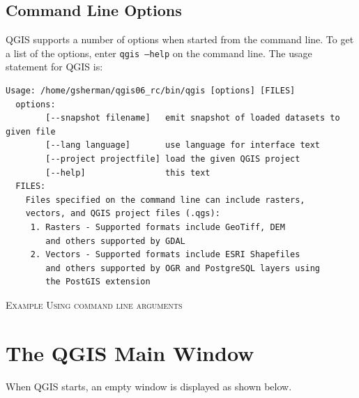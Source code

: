 \subsection{Command Line Options}
QGIS supports a number of options when started from the command line. To get a
list of the options, enter \texttt{qgis ---help} on the command line. The usage
statement for QGIS is:
\small
\begin{verbatim}
Usage: /home/gsherman/qgis06_rc/bin/qgis [options] [FILES]
  options:
        [--snapshot filename]   emit snapshot of loaded datasets to given file
        [--lang language]       use language for interface text
        [--project projectfile] load the given QGIS project
        [--help]                this text
  FILES:
    Files specified on the command line can include rasters,
    vectors, and QGIS project files (.qgs):
     1. Rasters - Supported formats include GeoTiff, DEM
        and others supported by GDAL
     2. Vectors - Supported formats include ESRI Shapefiles
        and others supported by OGR and PostgreSQL layers using
        the PostGIS extension

\end{verbatim}
\normalsize
\begin{Tip} \caption{\textsc{Example Using command line arguments}}
\end{Tip}

\section{The QGIS Main Window}
When QGIS starts, an empty window is displayed as shown below.

